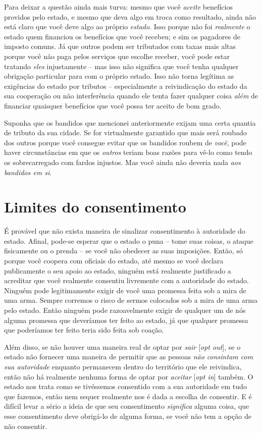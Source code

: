 Para deixar a questão ainda mais turva: mesmo que você \emph{aceite} benefícios providos pelo estado, e mesmo que deva algo em troca como resultado, ainda não está claro que você deve algo ao próprio \emph{estado}. Isso porque não foi \emph{realmente} o estado quem financiou os benefícios que você recebeu; e sim os pagadores de imposto comuns. Já que outros podem ser tributados com taxas mais altas porque você não paga pelos serviços que escolhe receber, você pode estar tratando \emph{eles} injustamente -- mas isso não significa que você tenha qualquer obrigação particular para com o próprio estado. Isso não torna legítima as exigências do estado por tributos -- especialmente a reivindicação do estado da sua cooperação ou não interferência quando ele tenta fazer qualquer coisa \emph{além} de financiar quaisquer benefícios que você possa ter aceito de bom grado.

Suponha que os bandidos que mencionei anteriormente exijam uma certa quantia de tributo da sua cidade. Se for virtualmente garantido que mais será roubado dos outros porque você consegue evitar que os bandidos roubem de \emph{você}, pode haver circunstâncias em que os \emph{outros} teriam boas razões para vê-lo como tendo os sobrecarregado com fardos injustos. Mas você ainda não deveria nada \emph{aos bandidos em si}.

\section{Limites do consentimento}

É provável que não exista maneira de sinalizar consentimento à autoridade do estado. Afinal, pode-se esperar que o estado o puna -- tome suas coisas, o ataque fisicamente ou o prenda -- se você não obedecer as suas imposições. Então, só porque você coopera com oficiais do estado, até mesmo se você declara publicamente o seu apoio ao estado, ninguém está realmente justificado a acreditar que você realmente consentiu livremente com a autoridade do estado. Ninguém pode legitimamente exigir de você uma promessa feita sob a mira de uma arma. Sempre corremos o risco de sermos colocados sob a mira de uma arma pelo estado. Então ninguém pode razoavelmente exigir de qualquer um de nós alguma promessa que deveríamos ter feito ao estado, já que qualquer promessa que poderíamos ter feito teria sido feita sob coação.

Além disso, se não houver uma maneira real de optar por \emph{sair} [\emph{opt out}], se o estado não fornecer uma maneira de permitir que as pessoas \emph{não consintam com sua autoridade} enquanto permanecem dentro do território que ele reivindica, então não há realmente nenhuma forma de optar por \emph{aceitar} [\emph{opt in}] também. O estado nos trata como se tivéssemos consentido com a sua autoridade em tudo que fazemos, então nem sequer realmente nos é dada a escolha de consentir. E é difícil levar a sério a ideia de que seu consentimento \emph{significa} alguma coisa, que esse consentimento deve obrigá-lo de alguma forma, se você não tem a opção de não consentir.

